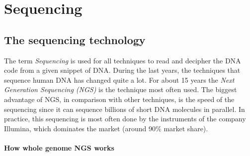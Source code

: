 \section{Sequencing}

\subsection{The sequencing technology}

The term \emph{Sequencing} is used for all techniques to read and decipher the DNA code from a given snippet of DNA. During the last years, the techniques that sequence human DNA has changed quite a lot. For about 15 years the \emph{Next Generation Sequencing (NGS)} is the technique most often used. The biggest advantage of NGS, in comparison with other techniques, is the speed of the sequencing since it can sequence billions of short DNA molecules in parallel. In practice, this sequencing is most often done by the instruments of the company Illumina, which dominates the market (around 90\% market share).

\paragraph{How whole genome NGS works}

